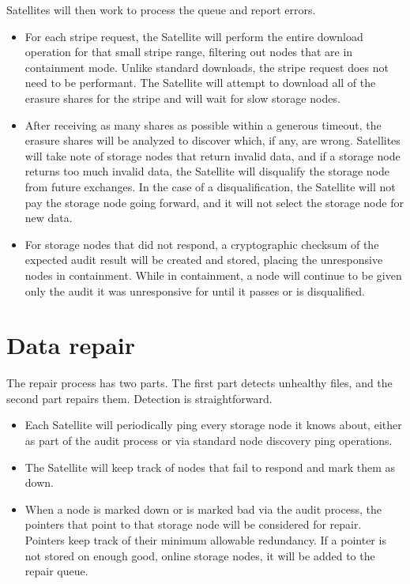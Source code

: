 \documentclass[8pt,fleqn,openany]{book}
\begin{document}
Satellites will then work to process the queue and report errors.
\begin{itemize}
\item For each stripe request, the Satellite will perform the entire download
  operation for that small stripe range, filtering out nodes that are in
  containment mode. Unlike standard downloads, the stripe
  request does not need to be performant. The Satellite will attempt to
  download all of the erasure shares for the stripe and will wait for slow
  storage nodes.
\item After receiving as many shares as possible within a generous timeout,
  the erasure shares will be analyzed to discover which, if any, are wrong.
  Satellites will take note of storage nodes that return invalid data, and if a
  storage node returns too much invalid data, the Satellite will disqualify
  the storage node from future exchanges. In the case of a disqualification,
  the Satellite will not pay the storage node going forward, and it will not
  select the storage node for new data.
\item For storage nodes that did not respond, a cryptographic checksum of the
  expected audit result will be created and stored, placing the unresponsive
  nodes in containment. While in containment, a node will continue to be
  given only the audit it was unresponsive for until it passes or is
  disqualified.
\end{itemize}

\section{Data repair}

The repair process has two parts. The first part detects unhealthy files, and
the second part repairs them. Detection is straightforward.

\begin{itemize}
\item Each Satellite will periodically ping every storage node it knows
about, either as part of the audit process or via standard node discovery ping operations.
\item The Satellite will keep track of nodes that fail to respond and mark
  them as down.
\item When a node is marked down or is marked bad via the audit process, the
  pointers that point to that storage node will be considered for repair.
  Pointers
  keep track of their minimum allowable redundancy. If a pointer is not stored
  on enough good, online storage nodes, it will be added to the repair queue.
\end{itemize}
\end{document}
